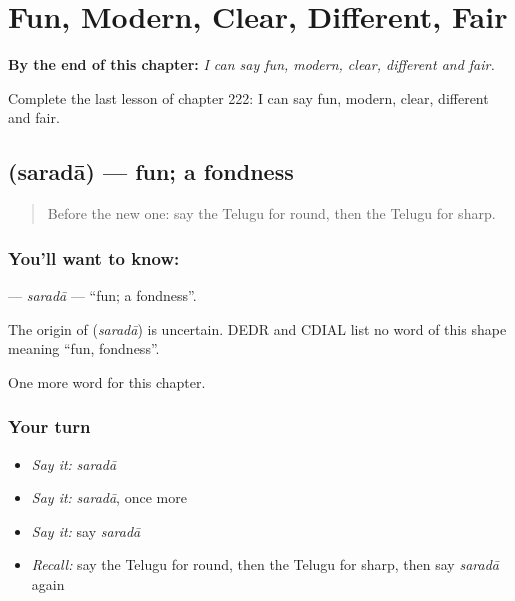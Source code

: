 
\chapter{Fun, Modern, Clear, Different, Fair}
\label{ch:te-fun-modern-clear-different-fair}

\begin{chapteropening}
\textbf{By the end of this chapter:} \emph{I can say fun, modern, clear, different and fair.}

Complete the last lesson of chapter 222: I can say fun, modern, clear, different and fair.
\end{chapteropening}

\section[\texorpdfstring{\te{సరదా} (saradā)}{సరదా (saradā)}]{ (saradā) — fun; a fondness}

\label{lesson:TE-C222-sarada}



\begin{quote}
Before the new one: say the Telugu for round, then the Telugu for sharp.
\end{quote}

\subsection*{You'll want to know: }
\textbf{} — \emph{saradā} — \textquotedblleft{}fun; a fondness\textquotedblright{}.

\begin{cousinweb}
The origin of \textbf{} (\emph{saradā}) is uncertain. DEDR and CDIAL list no word of this shape meaning \textquotedblleft{}fun, fondness\textquotedblright{}.
\end{cousinweb}

\begin{grammarlens}[title={What you've built}]
One more word for this chapter.
\end{grammarlens}

\subsection*{Your turn}
\begin{itemize}
\raggedright
  \item \emph{Say it:} \emph{saradā}
  \item \emph{Say it:} \emph{saradā}, once more
  \item \emph{Say it:} say \emph{saradā}
  \item \emph{Recall:} say the Telugu for round, then the Telugu for sharp, then say \emph{saradā} again
\end{itemize}

